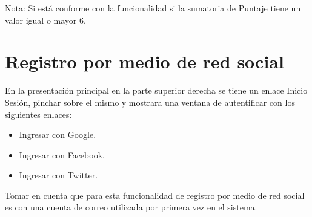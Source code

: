 Nota: Si está conforme con la funcionalidad  si la sumatoria de Puntaje tiene un 
valor igual o mayor 6.

\section{Registro por medio de red social}

En la presentación principal en la parte superior derecha se tiene un enlace 
Inicio Sesión, pinchar sobre el mismo y mostrara una ventana de autentificar
con los siguientes enlaces:

\begin{itemize}
	\item Ingresar con Google.
	\item Ingresar con Facebook.
	\item Ingresar con Twitter.
\end{itemize}

Tomar en cuenta que para esta funcionalidad de registro por medio de red social
es con una cuenta de correo utilizada por primera vez en el sistema.

